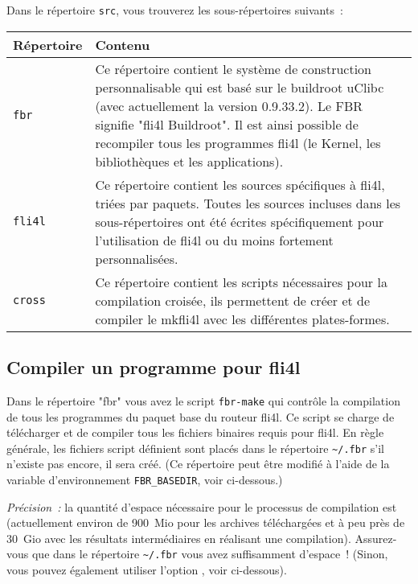 Dans le répertoire \texttt{src}, vous trouverez les sous-répertoires suivants~:

\begin{longtable}{|l|p{10cm}|}
    \hline
    \multicolumn{1}{|l}{\textbf{Répertoire}} &
    \multicolumn{1}{|l|}{\textbf{Contenu}} \\
    \hline
    \endhead
    \hline
    \endfoot
    \endlastfoot
\texttt{fbr} &
    Ce répertoire contient le système de construction personnalisable qui
    est basé sur le buildroot uClibc (avec actuellement la version 0.9.33.2).
    Le FBR signifie "fli4l Buildroot". Il est ainsi possible de recompiler tous
    les programmes fli4l (le Kernel, les bibliothèques et les applications). \\
\hline
\texttt{fli4l} &
    Ce répertoire contient les sources spécifiques à fli4l, triées par paquets.
    Toutes les sources incluses dans les sous-répertoires ont été écrites
    spécifiquement pour l'utilisation de fli4l ou du moins fortement
    personnalisées. \\
\hline
\texttt{cross} &
    Ce répertoire contient les scripts nécessaires pour la compilation croisée,
    ils permettent de créer et de compiler le mkfli4l avec les différentes
    plates-formes. \\
\hline
\end{longtable}

\subsection{Compiler un programme pour fli4l}

Dans le répertoire "fbr" vous avez le script \texttt{fbr-make} qui contrôle
la compilation de tous les programmes du paquet base du routeur fli4l. Ce script
se charge de télécharger et de compiler tous les fichiers binaires requis pour
fli4l. En règle générale, les fichiers script définient sont placés dans le
répertoire \texttt{\~{}/.fbr} s'il n'existe pas encore, il sera créé.
(Ce répertoire peut être modifié à l'aide de la variable d'environnement
\texttt{FBR\_BASEDIR}, voir ci-dessous.)

\emph{Précision~:} la quantité d'espace nécessaire pour le processus de compilation
est (actuellement environ de 900~Mio pour les archives téléchargées et à peu
près de 30~Gio avec les résultats intermédiaires en réalisant une compilation).
Assurez-vous que dans le répertoire \texttt{\~{}/.fbr} vous avez suffisamment
d'espace~! (Sinon, vous pouvez également utiliser l'option , voir
ci-dessous).

